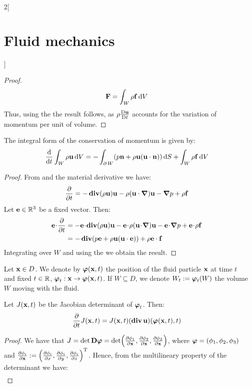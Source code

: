 \documentclass[../../../main_physics.tex]{subfiles}
\begin{document}
\begin{multicols}{2}[\section{Fluid mechanics}]
\begin{proof}
    $$
      \boldsymbol{\mathrm{F}}=\int_W\rho\boldsymbol{\mathrm{f}}\dd{V}
    $$
    Thus, using the  the result follows, as $\rho\frac{\mathrm{D}\boldsymbol{\mathrm{u}}}{\mathrm{D}t}$ accounts for the variation of momentum per unit of volume.
  \end{proof}
  \begin{corollary}
    The integral form of the conservation of momentum is given by:
    $$
      \dv{}{t}\int_W\rho\boldsymbol{\mathrm{u}}\dd{V}=-\int_{\operatorname{\partial}{W}}(p\boldsymbol{\mathrm{n}}+\rho\boldsymbol{\mathrm{u}}(\boldsymbol{\mathrm{u}}\cdot\boldsymbol{\mathrm{n}}))\dd{S}+\int_W\rho\boldsymbol{\mathrm{f}}\dd{V}
    $$
  \end{corollary}
  \begin{proof}
    From  and the material derivative we have:
    $$
      \pdv{}{t}(\rho\boldsymbol{\mathrm{u}})=-\operatorname{\boldsymbol{\mathrm{div}}}(\rho\boldsymbol{\mathrm{u}})\boldsymbol{\mathrm{u}}-\rho(\boldsymbol{\mathrm{u}}\cdot \grad )\boldsymbol{\mathrm{u}}-\grad p+\rho\boldsymbol{\mathrm{f}}
    $$
    Let $\boldsymbol{\mathrm{e}}\in\mathbb{R}^3$ be a fixed vector. Then:
    \begin{align*}
      \vf{e}\!\cdot\! \pdv{}{t}(\rho\vf{u}) & =-\vf{e}\!\cdot\!\div(\rho\vf{u})\vf{u}-\vf{e}\!\cdot\!\rho(\vf{u}\!\cdot\! \grad) \vf{u}-\vf{e}\!\cdot\!\grad p+\vf{e}\!\cdot\!\rho\vf{f} \\
                                            & =-\div(p\vf{e}+\rho \vf{u}(\vf{u}\cdot\vf{e}))+\rho\vf{e}\cdot\vf{f}
    \end{align*}
    Integrating over $W$ and using the  we obtain the result.
  \end{proof}
  \begin{definition}
    Let $\boldsymbol{\mathrm{x}}\in D$. We denote by $\boldsymbol{\mathrm{\varphi}}(\boldsymbol{\mathrm{x}},t)$ the position of the fluid particle $\boldsymbol{\mathrm{x}}$ at time $t$ and fixed $t\in \mathbb{R}$, $\boldsymbol{\mathrm{\varphi}}_t:\boldsymbol{\mathrm{x}}\to\boldsymbol{\mathrm{\varphi}}(\boldsymbol{\mathrm{x}},t)$. If $W\subseteq D$, we denote $W_t:=\boldsymbol{\mathrm{\varphi}}_t(W)$ the volume $W$ moving with the fluid.
  \end{definition}
  \begin{lemma}\label{FLM:lemmaJacobian}
    Let $J(\boldsymbol{\mathrm{x}},t)$ be the Jacobian determinant of $\boldsymbol{\mathrm{\varphi}}_t$. Then:
    $$
      \pdv{}{t} J(\boldsymbol{\mathrm{x}},t)=J(\boldsymbol{\mathrm{x}},t)(\operatorname{\boldsymbol{\mathrm{div}}}\boldsymbol{\mathrm{u}})(\boldsymbol{\mathrm{\varphi}}(\boldsymbol{\mathrm{x}},t),t)
    $$
  \end{lemma}
  \begin{proof}
    We have that $J=\det\boldsymbol{\mathrm{D\varphi}} = \det(\pdv{\phi_1}{\boldsymbol{\mathrm{x}}},\pdv{\phi_2}{\boldsymbol{\mathrm{x}}},\pdv{\phi_3}{\boldsymbol{\mathrm{x}}})$, where $\boldsymbol{\mathrm{\varphi}} = (\phi_1,\phi_2,\phi_3)$ and $\pdv{\phi_i}{\boldsymbol{\mathrm{x}}} := {\left(
        \pdv{\phi_i}{x}, \pdv{\phi_i}{y}, \pdv{\phi_i}{z}
        \right)}^{\mathrm{T}}$. Hence, from the multilineary property of the determinant we have:
    \begin{multline}\label{FLM:Jacobian}

\end{multline}
\end{proof}
\end{multicols}
\end{document}
